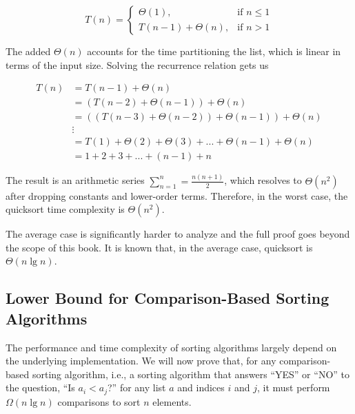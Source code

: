 \[
T(n)=
  \begin{cases}
    \Theta(1), & \text{if } n \leq 1\\
    T(n - 1) + \Theta(n), & \text{if } n > 1
  \end{cases}
\]

The added $\Theta(n)$ accounts for the time partitioning the list, which is linear in terms of the input size. Solving the recurrence relation gets us

\begin{align*}
T(n) &= T(n - 1) + \Theta(n)\\
     &= (T(n - 2) + \Theta(n - 1)) + \Theta(n)\\
     &= ((T(n - 3) + \Theta(n - 2)) + \Theta(n - 1)) + \Theta(n)\\
     &\vdots\\
     &= T(1) + \Theta(2) + \Theta(3) + ... + \Theta(n - 1) + \Theta(n)\\
     &= 1 + 2 + 3 + ... + (n - 1) + n
\end{align*}

The result is an arithmetic series $\sum_{n=1}^{n}=\frac{n(n+1)}{2}$, which resolves to $\Theta(n^2)$ after dropping constants and lower-order terms. Therefore, in the worst case, the quicksort time complexity is $\Theta(n^2)$.

The average case is significantly harder to analyze and the full proof goes beyond the scope of this book. It is known that, in the average case, quicksort is $\Theta(n\lg{n})$. 

\subsection*{Lower Bound for Comparison-Based Sorting Algorithms}
The performance and time complexity of sorting algorithms largely depend on the underlying implementation. We will now prove that, for any comparison-based sorting algorithm, i.e., a sorting algorithm that answers ``YES'' or ``NO'' to the question, ``Is $a_i < a_j$?'' for any list $a$ and indices $i$ and $j$, it must perform $\Omega(n \lg n)$ comparisons to sort $n$ elements.

